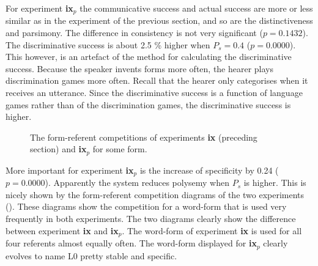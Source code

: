 For experiment {\bf ix$_p$} the communicative success and actual success are more or less similar as in the experiment of the previous section, and so are the distinctiveness and parsimony. The difference in consistency is not very significant ($p=0.1432$). The discriminative success is about 2.5 \% higher when $P_s=0.4$ ($p=0.0000$). This however, is an artefact of the method for calculating the discriminative success. Because the speaker invents forms more often, the hearer plays discrimination games more often. Recall that the hearer only categorises when it receives an utterance. Since the discriminative success is a function of language games rather than of the discrimination games, the discriminative success is higher.

\begin{figure}[t]
\centering
{}
\caption{The form-referent competitions of experiments {\bf ix} (preceding section) and {\bf ix$_p$} for some form.}
\label{f:par:FR-comp}
\end{figure}

More important for experiment {\bf ix$_p$} is the increase of specificity by 0.24 ($p=0.0000$). Apparently the system reduces polysemy when $P_s$ is higher. This is nicely shown by the form-referent competition diagrams of the two experiments (). These diagrams show the competition for a word-form that is used very frequently in both experiments. The two diagrams clearly show the difference between experiment {\bf ix} and {\bf ix$_p$}. The word-form of experiment {\bf ix} is used for all four referents almost equally often. The word-form displayed for {\bf ix$_p$} clearly evolves to name L0 pretty stable and specific.


